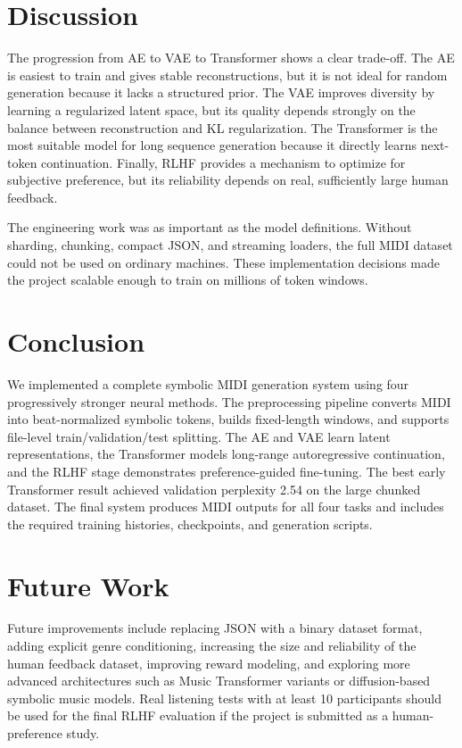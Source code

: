 \documentclass{article}
\begin{document}
\section{Discussion}
The progression from AE to VAE to Transformer shows a clear trade-off. The AE is easiest to train and gives stable reconstructions, but it is not ideal for random generation because it lacks a structured prior. The VAE improves diversity by learning a regularized latent space, but its quality depends strongly on the balance between reconstruction and KL regularization. The Transformer is the most suitable model for long sequence generation because it directly learns next-token continuation. Finally, RLHF provides a mechanism to optimize for subjective preference, but its reliability depends on real, sufficiently large human feedback.

The engineering work was as important as the model definitions. Without sharding, chunking, compact JSON, and streaming loaders, the full MIDI dataset could not be used on ordinary machines. These implementation decisions made the project scalable enough to train on millions of token windows.

\section{Conclusion}
We implemented a complete symbolic MIDI generation system using four progressively stronger neural methods. The preprocessing pipeline converts MIDI into beat-normalized symbolic tokens, builds fixed-length windows, and supports file-level train/validation/test splitting. The AE and VAE learn latent representations, the Transformer models long-range autoregressive continuation, and the RLHF stage demonstrates preference-guided fine-tuning. The best early Transformer result achieved validation perplexity 2.54 on the large chunked dataset. The final system produces MIDI outputs for all four tasks and includes the required training histories, checkpoints, and generation scripts.

\section{Future Work}
Future improvements include replacing JSON with a binary dataset format, adding explicit genre conditioning, increasing the size and reliability of the human feedback dataset, improving reward modeling, and exploring more advanced architectures such as Music Transformer variants or diffusion-based symbolic music models. Real listening tests with at least 10 participants should be used for the final RLHF evaluation if the project is submitted as a human-preference study.
\end{document}
